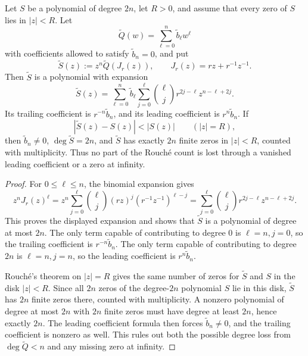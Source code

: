 \begin{lemma}\label{lem:outer-rouche-prevents-degree-loss}
Let \(S\) be a polynomial of degree \(2n\), let \(R>0\), and assume that every zero of \(S\) lies in \(|z|<R\).  Let
\[
\widetilde Q(w)=\sum_{\ell=0}^{n}\widetilde b_\ell w^\ell
\]
with coefficients allowed to satisfy \(\widetilde b_n=0\), and put
\[
\widetilde S(z):=z^n\widetilde Q(J_r(z)),
\qquad J_r(z)=rz+r^{-1}z^{-1}.
\]
Then \(\widetilde S\) is a polynomial with expansion
\[
\widetilde S(z)=
\sum_{\ell=0}^{n}\widetilde b_\ell
\sum_{j=0}^{\ell}\binom{\ell}{j}r^{2j-\ell}z^{n-\ell+2j}.
\]
Its trailing coefficient is \(r^{-n}\widetilde b_n\), and its leading coefficient is \(r^n\widetilde b_n\).  If
\[
|\widetilde S(z)-S(z)|<|S(z)|\qquad(|z|=R),
\]
then \(\widetilde b_n\ne0\), \(\deg\widetilde S=2n\), and \(\widetilde S\) has exactly \(2n\) finite zeros in \(|z|<R\), counted with multiplicity.  Thus no part of the Rouch\'e count is lost through a vanished leading coefficient or a zero at infinity.
\end{lemma}

\begin{proof}
For \(0\le\ell\le n\), the binomial expansion gives
\[
z^nJ_r(z)^\ell
=z^n\sum_{j=0}^{\ell}\binom{\ell}{j}(rz)^j(r^{-1}z^{-1})^{\ell-j}
=\sum_{j=0}^{\ell}\binom{\ell}{j}r^{2j-\ell}z^{n-\ell+2j}.
\]
This proves the displayed expansion and shows that \(\widetilde S\) is a polynomial of degree at most \(2n\).  The only term capable of contributing to degree \(0\) is \(\ell=n,j=0\), so the trailing coefficient is \(r^{-n}\widetilde b_n\).  The only term capable of contributing to degree \(2n\) is \(\ell=n,j=n\), so the leading coefficient is \(r^n\widetilde b_n\).

Rouch\'e's theorem on \(|z|=R\) gives the same number of zeros for \(\widetilde S\) and \(S\) in the disk \(|z|<R\).  Since all \(2n\) zeros of the degree-\(2n\) polynomial \(S\) lie in this disk, \(\widetilde S\) has \(2n\) finite zeros there, counted with multiplicity.  A nonzero polynomial of degree at most \(2n\) with \(2n\) finite zeros must have degree at least \(2n\), hence exactly \(2n\).  The leading coefficient formula then forces \(\widetilde b_n\ne0\), and the trailing coefficient is nonzero as well.  This rules out both the possible degree loss from \(\deg\widetilde Q<n\) and any missing zero at infinity.
\end{proof}

